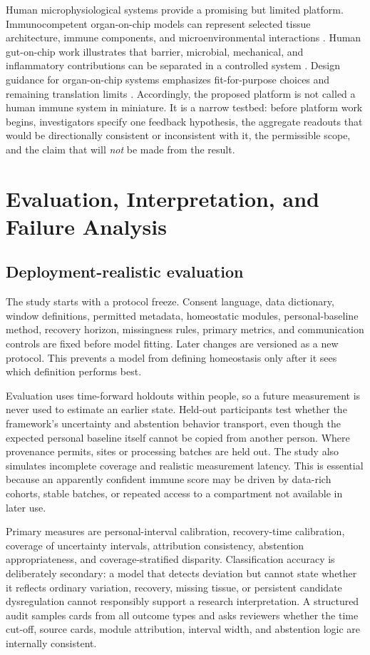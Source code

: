 \documentclass[conference]{IEEEtran}
\begin{document}
Human microphysiological systems provide a promising but limited platform. Immunocompetent organ-on-chip models can represent selected tissue architecture, immune components, and microenvironmental interactions \cite{maharjan2020}. Human gut-on-chip work illustrates that barrier, microbial, mechanical, and inflammatory contributions can be separated in a controlled system \cite{kim2016}. Design guidance for organ-on-chip systems emphasizes fit-for-purpose choices and remaining translation limits \cite{leung2022}. Accordingly, the proposed platform is not called a human immune system in miniature. It is a narrow testbed: before platform work begins, investigators specify one feedback hypothesis, the aggregate readouts that would be directionally consistent or inconsistent with it, the permissible scope, and the claim that will \emph{not} be made from the result.

\section{Evaluation, Interpretation, and Failure Analysis}

\subsection{Deployment-realistic evaluation}

The study starts with a protocol freeze. Consent language, data dictionary, window definitions, permitted metadata, homeostatic modules, personal-baseline method, recovery horizon, missingness rules, primary metrics, and communication controls are fixed before model fitting. Later changes are versioned as a new protocol. This prevents a model from defining homeostasis only after it sees which definition performs best.

Evaluation uses time-forward holdouts within people, so a future measurement is never used to estimate an earlier state. Held-out participants test whether the framework's uncertainty and abstention behavior transport, even though the expected personal baseline itself cannot be copied from another person. Where provenance permits, sites or processing batches are held out. The study also simulates incomplete coverage and realistic measurement latency. This is essential because an apparently confident immune score may be driven by data-rich cohorts, stable batches, or repeated access to a compartment not available in later use.

Primary measures are personal-interval calibration, recovery-time calibration, coverage of uncertainty intervals, attribution consistency, abstention appropriateness, and coverage-stratified disparity. Classification accuracy is deliberately secondary: a model that detects deviation but cannot state whether it reflects ordinary variation, recovery, missing tissue, or persistent candidate dysregulation cannot responsibly support a research interpretation. A structured audit samples cards from all outcome types and asks reviewers whether the time cut-off, source cards, module attribution, interval width, and abstention logic are internally consistent.
\end{document}
